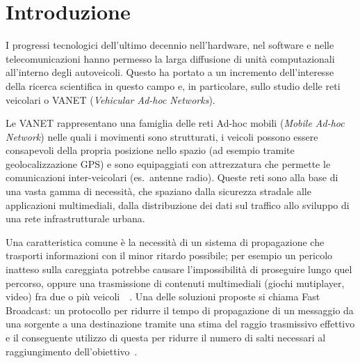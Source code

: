 
\chapter{Introduzione}\label{chap:introduction}
I progressi tecnologici dell'ultimo decennio nell'hardware, nel software e nelle telecomunicazioni hanno permesso
la larga diffusione di unità computazionali all'interno degli autoveicoli. %
Questo ha portato a un incremento dell'interesse della ricerca scientifica in questo campo e, in particolare,
sullo studio delle reti veicolari o VANET (\textit{Vehicular Ad-hoc Networks}).

Le VANET rappresentano una famiglia delle reti Ad-hoc mobili (\textit{Mobile Ad-hoc Network})
nelle quali i movimenti sono strutturati, i veicoli possono essere consapevoli della propria posizione nello spazio (ad esempio tramite geolocalizzazione GPS)
e sono equipaggiati con attrezzatura che permette le comunicazioni inter-veicolari (es.~antenne radio).
Queste reti sono alla base di una vasta gamma di necessità, che spaziano dalla sicurezza stradale alle applicazioni multimediali,
dalla distribuzione dei dati sul traffico allo sviluppo di una rete infrastrutturale urbana.

Una caratteristica comune è la necessità di un sistema di propagazione che trasporti informazioni
con il minor ritardo possibile; per esempio un pericolo inatteso sulla careggiata potrebbe causare l'impossibilità di proseguire
lungo quel percorso, oppure una trasmissione di contenuti multimediali (giochi mutiplayer, video) fra due o più veicoli~\cite{1580935}~\cite{PantelW02}.
Una delle soluzioni proposte si chiama Fast Broadcast: un protocollo per ridurre il tempo di propagazione
di un messaggio da una sorgente a una destinazione tramite una stima del raggio trasmissivo effettivo e
il conseguente utilizzo di questa per ridurre il numero di salti necessari al raggiungimento dell'obiettivo~\cite{Palazzi07howdo}.

